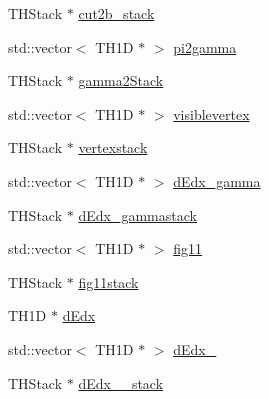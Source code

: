 \begin{DoxyCompactItemize}
\item 
THStack $\ast$ \hyperlink{namespaceana_1_1SBNOsc_abee8fcfad8f7a669abab543ecb154c40}{cut2b\_\-stack}
\item 
std::vector$<$ TH1D $\ast$ $>$ \hyperlink{namespaceana_1_1SBNOsc_afeea6a75b46adcbda7b0a958a3481c57}{pi2gamma}
\item 
THStack $\ast$ \hyperlink{namespaceana_1_1SBNOsc_a30d63f8aba0987e9f063a67cce396d97}{gamma2Stack}
\item 
std::vector$<$ TH1D $\ast$ $>$ \hyperlink{namespaceana_1_1SBNOsc_a95cef1471ba412cf64f93382ecf777ed}{visiblevertex}
\item 
THStack $\ast$ \hyperlink{namespaceana_1_1SBNOsc_ab0d2c7f96f4320254bbda9e0041e6a3e}{vertexstack}
\item 
std::vector$<$ TH1D $\ast$ $>$ \hyperlink{namespaceana_1_1SBNOsc_a8bedf9b350e32fa2630521a1eb2a3b3c}{dEdx\_\-gamma}
\item 
THStack $\ast$ \hyperlink{namespaceana_1_1SBNOsc_a8edd8b5017a133cdd3e468899e0f7a5f}{dEdx\_\-gammastack}
\item 
std::vector$<$ TH1D $\ast$ $>$ \hyperlink{namespaceana_1_1SBNOsc_a0c37526999b8777b80e9324b335de4a9}{fig11}
\item 
THStack $\ast$ \hyperlink{namespaceana_1_1SBNOsc_adadc17855404843a6eb2a4306e22a460}{fig11stack}
\item 
TH1D $\ast$ \hyperlink{namespaceana_1_1SBNOsc_a8b644de838352477b63ffdd383f6c253}{dEdx}
\item 
std::vector$<$ TH1D $\ast$ $>$ \hyperlink{namespaceana_1_1SBNOsc_ab49147463b012e19132ce3747551ddfd}{dEdx\_}
\item 
THStack $\ast$ \hyperlink{namespaceana_1_1SBNOsc_ab1c4aa783d9a2387391c600f3988fac5}{dEdx\_\_\-stack}
\end{DoxyCompactItemize}



